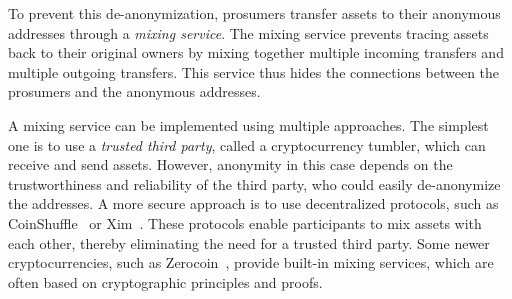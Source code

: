 To prevent this de-anonymization, prosumers transfer assets to their
anonymous addresses through a \emph{mixing service}.  The mixing
service prevents tracing assets back to their original owners by
mixing together multiple incoming transfers and multiple outgoing
transfers. This service thus hides the connections between the
prosumers and the anonymous addresses.

A mixing service can be implemented using multiple approaches.  The
simplest one is to use a \emph{trusted third party}, called a
cryptocurrency tumbler, which can receive and send assets. However, anonymity
in this case depends on the trustworthiness and reliability
of the third party, who could easily de-anonymize the addresses.  A
more secure approach is to use decentralized protocols, such as
CoinShuffle~\cite{ruffing2014coinshuffle} or
Xim~\cite{bissias2014sybil}.  These protocols enable participants to
mix assets with each other, thereby eliminating the need for a trusted
third party.
Some newer cryptocurrencies, such as
Zerocoin~\cite{miers2013zerocoin}, provide built-in mixing services,
which are often based on cryptographic principles and proofs.

